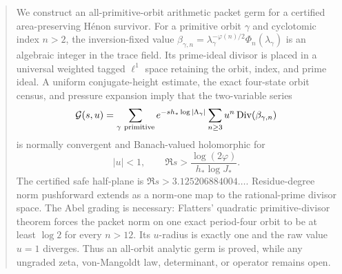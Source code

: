 \begin{abstract}
We construct an all-primitive-orbit arithmetic packet germ for a certified
area-preserving H\'enon survivor.  For a primitive orbit $\gamma$ and
cyclotomic index $n>2$, the inversion-fixed value
$\beta_{\gamma,n}=\lambda_\gamma^{-\varphi(n)/2}\Phi_n(\lambda_\gamma)$ is
an algebraic integer in the trace field.  Its prime-ideal divisor is placed
in a universal weighted tagged $\ell^1$ space retaining the orbit, index,
and prime ideal.  A uniform conjugate-height estimate, the exact four-state
orbit census, and pressure expansion imply that the two-variable series
\[
\mathcal G(s,u)=\sum_{\gamma\ {\rm primitive}}
e^{-s h_*\log|\Lambda_\gamma|}
\sum_{n\ge3}u^n\Div(\beta_{\gamma,n})
\]
is normally convergent and Banach-valued holomorphic for
\[
|u|<1,\qquad
\Re s>\frac{\log(2\varphi)}{h_*\log J_*}.
\]
The certified safe half-plane is
$\Re s>3.125206884004\ldots$.  Residue-degree norm pushforward extends as a
norm-one map to the rational-prime divisor space.  The Abel grading is
necessary: Flatters' quadratic primitive-divisor theorem forces the packet
norm on one exact period-four orbit to be at least $\log2$ for every
$n>12$.  Its $u$-radius is exactly one and the raw value $u=1$ diverges.
Thus an all-orbit analytic germ is proved, while any ungraded zeta,
von-Mangoldt law, determinant, or operator remains open.
\end{abstract}
